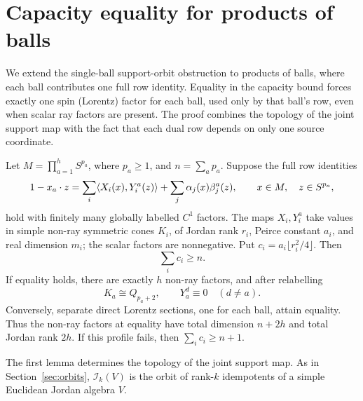 \section{Capacity equality for products of balls}
\label{sec:product-orbit-saturation}
\label{subsec:product-orbit-saturation}
We extend the single-ball support-orbit obstruction to products of
balls, where each ball contributes one full row identity. Equality in
the capacity bound forces exactly one spin (Lorentz) factor for each
ball, used only by that ball's row, even when scalar ray factors are
present. The proof combines the topology of the joint support map with
the fact that each dual row depends on only one source coordinate.

\begin{theorem}
\label{thm:product-orbit-saturation}
Let $M=\prod_{a=1}^h S^{p_a}$, where $p_a\geq1$, and $n=\sum_a p_a$.
Suppose the full row identities
\begin{equation}\label{eq:product-orbit-rows}
 1-x_a\cdot z
 =\sum_i\langle X_i(x),Y_i^a(z)\rangle
   +\sum_j\alpha_j(x)\beta_j^a(z),
 \qquad x\in M,\quad z\in S^{p_a},
\end{equation}
hold with finitely many globally labelled $C^1$ factors. The maps $X_i,Y_i^a$
take values in simple non-ray symmetric cones $K_i$, of Jordan rank $r_i$,
Peirce constant $a_i$, and real dimension $m_i$; the scalar factors are
nonnegative. Put $c_i=a_i\lfloor r_i^2/4\rfloor$. Then
\[
 \sum_i c_i\geq n.
\]
If equality holds, there are exactly $h$ non-ray factors, and after
relabelling
\[
 K_a\cong Q_{p_a+2},\qquad Y_a^d\equiv0\quad(d\ne a).
\]
Conversely, separate direct Lorentz sections, one for each ball, attain
equality. Thus the non-ray factors at equality have total dimension
$n+2h$ and total Jordan rank $2h$. If this profile fails,
then $\sum_i c_i\geq n+1$.
\end{theorem}

The first lemma determines the topology of the joint support map. As in
Section~\ref{sec:orbits}, $\mathcal I_k(V)$ is the orbit of rank-$k$
idempotents of a simple Euclidean Jordan algebra $V$.

